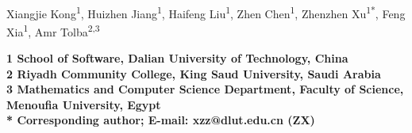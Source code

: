 \documentclass[10pt,letterpaper]{article}
\date{}
\begin{document}
\vspace*{0.35in}

\begin{flushleft}
{\Large
\textbf{}
}
\newline
\\
Xiangjie Kong\textsuperscript{1},
Huizhen Jiang\textsuperscript{1},
Haifeng Liu\textsuperscript{1},
Zhen Chen\textsuperscript{1},
Zhenzhen Xu\textsuperscript{1*},
Feng Xia\textsuperscript{1},
Amr Tolba\textsuperscript{2,3}


\bf{1} School of Software, Dalian University of Technology, China\\
\bf{2} Riyadh Community College, King Saud University, Saudi Arabia\\
\bf{3} Mathematics and Computer Science Department, Faculty of Science, Menoufia University, Egypt
\\

%
%





* Corresponding author; E-mail: xzz@dlut.edu.cn (ZX)
\end{flushleft}
\end{document}
